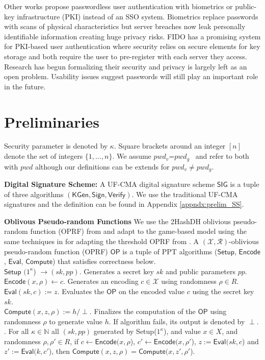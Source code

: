 \documentclass[conference]{IEEEtran}
\newcommand{\secparameter}{\kappa}
\newcommand{\pwg}{$pwd_g$}
\newcommand{\pwv}{$pwd_v$}
\newcommand{\pwd}{pwd}
\begin{document}
Other works propose passwordless user authentication with biometrics or public-key infrastructure (PKI) instead of an SSO system. Biometrics replace passwords with scans of physical characteristics \cite{mock2012real,10.1145/2382196.2382307}
but server breaches now leak personally identifiable information creating huge privacy risks. FIDO \cite{FIDO} has a promising system for PKI-based user authentication where security relies on secure elements for key storage and both require the user to pre-register with each server they access. Research has begun formalizing their security \cite{Bindel2022} and privacy is largely left as an open problem. Usability issues \cite{9152694} suggest passwords will still play an important role in the future.

\section{Preliminaries}
\label{sec:preliminaries}

Security parameter is denoted by $\secparameter$. Square brackets around an integer $[n]$ denote the set of integers $\{1,\ldots,n\}$. We assume \pwv=\pwg~ and refer to both with $\pwd$ although our definitions can be extends for \pwv$\neq$\pwg.
%

\noindent
{\bf Digital Signature Scheme:} A UF-CMA digital signature scheme $\mathsf{SIG}$ is a tuple of three algorithms $(\mathsf{KGen}, \mathsf{Sign}, \mathsf{Verify})$. We use the traditional UF-CMA signatures \cite{10.1137/0217017} and the definition can be found in Appendix \ref{appndx:prelim_SS}.

\noindent
{\bf Oblivous Pseudo-random Functions}
We use the 2HashDH oblivious pseudo-random function (OPRF) from \cite{7467360} and adapt to the game-based model using the same techniques in \cite{PASTA-Agrawal} for adapting the threshold OPRF from \cite{Jarecki2017TOPPSSCP}. A $(\mathcal{X},\mathcal{R})$-oblivious pseudo-random function (OPRF) $\mathsf{OP}$ is a tuple of PPT algorithms ($\mathsf{Setup}$, $\mathsf{Encode}$, $\mathsf{Eval}$, $\mathsf{Compute}$) that satisfies correctness below.
\\
$\mathsf{Setup}$ $(1^{\secparameter}$) $\rightarrow (sk,pp)$. Generates a secret key $sk$ and public parameters $pp$.\\
$\mathsf{Encode}(x,\rho) \leftarrow c$. Generates an encoding $c \in \mathcal{X}$ using randomness $\rho \in R$.\\
$\mathsf{Eval}(sk,c) := z$. Evaluates the $\mathsf{OP}$ on the encoded value $c$ using the secret key $sk$.\\
$\mathsf{Compute}(x,z,\rho) := h/\perp$. Finalizes the computation of the $\mathsf{OP}$ using randomness $\rho$ to generate value $h$. If algorithm fails, its output is denoted by $\perp$.\\
%
. For all $\secparameter \in \mathbb{N}$ all $(sk,pp)$ generated by Setup($1^{\secparameter}$), and value $x \in X$, and randomness $\rho, \rho' \in R$, if $c \leftarrow \mathsf{Encode}(x, \rho$), $c' \leftarrow \mathsf{Encode}(x, \rho'$), $z :=  \mathsf{Eval}(sk, c$) and $z' := \mathsf{Eval}(k,c'$), then $\mathsf{Compute}(x,z,\rho) = \mathsf{Compute}(x, z', \rho'$).
\\
\end{document}
